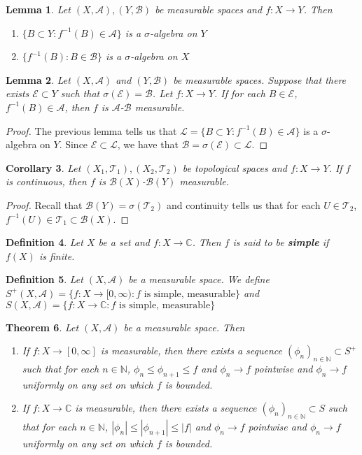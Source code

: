 \documentclass[12pt]{amsart}
\newtheorem{thm}{Theorem}[section]
\newtheorem{lem}[thm]{Lemma}
\newtheorem{cor}[thm]{Corollary}
\newtheorem{defn}[thm]{Definition}
\newcommand{\sig}{\sigma}
\newcommand{\C}{\mathbb{C}}
\newcommand{\N}{\mathbb{N}}
\newcommand{\MA}{\mathcal{A}}
\newcommand{\MB}{\mathcal{B}}
\newcommand{\ML}{\mathcal{L}}
\newcommand{\ME}{\mathcal{E}}
\newcommand{\MT}{\mathcal{T}}
\newcommand{\RG}{[0,\infty]}
\newcommand{\Rg}{[0,\infty)}
\begin{document}
\begin{lem}
Let $(X,\MA), (Y,\MB)$ be measurable spaces and $f: X \rightarrow Y$. Then 
\begin{enumerate}
\item $\{B \subset Y: f^{-1}(B) \in \MA\}$ is a $\sig$-algebra on $Y$
\item $\{f^{-1}(B): B \in \MB\}$ is a $\sig$-algebra on $X$
\end{enumerate}
\end{lem}

\begin{lem}
Let $(X,\MA)$ and $(Y, \MB)$ be measurable spaces. Suppose that there exists $\ME \subset Y$ such that $\sig(\ME) = \MB$. Let $f:X \rightarrow Y$. If for each $B \in \ME$, $f^{-1}(B) \in \MA$, then $f$ is $\MA$-$\MB$ measurable.
\end{lem}

\begin{proof}
The previous lemma tells us that $\ML = \{B \subset Y: f^{-1}(B) \in \MA\}$ is a $\sig$-algebra on $Y$. Since $\ME \subset \ML$, we have that $\MB = \sig(\ME) \subset \ML$.
\end{proof}

\begin{cor}
Let $(X_1,\MT_1), (X_2,\MT_2)$ be topological spaces and $f: X \rightarrow Y$. If $f$ is continuous, then $f$ is $\MB(X)$-$\MB(Y)$ measurable.
\end{cor}

\begin{proof}
Recall that $\MB(Y) = \sig(\MT_2)$ and continuity tells us that for each $U \in \MT_2$, $f^{-1}(U) \in \MT_1 \subset \MB(X)$. 
\end{proof}

\begin{defn}
Let $X$ be a set and $f:X \rightarrow \C$. Then $f$ is said to be \textbf{simple} if $f(X)$ is finite.
\end{defn}

\begin{defn}
Let $(X,\MA)$ be a measurable space. We define $S^+(X,\MA) = \{f:X \rightarrow \Rg: f \text{ is simple, measurable}\}$ and $S(X,\MA) = \{f: X \rightarrow \C: f \text{ is simple, measurable}\}$
\end{defn}

\begin{thm}
Let $(X, \MA)$ be a measurable space. Then 
\begin{enumerate}
\item If $f: X \rightarrow \RG$ is measurable, then there exists a sequence $(\phi_n)_{n \in \N} \subset S^+$ such that for each $n \in \N$, $\phi_n \leq \phi_{n+1} \leq f$ and $\phi_n \rightarrow f$ pointwise and $\phi_n \rightarrow f$ uniformly on any set on which $f$ is bounded.

\item If $f: X \rightarrow \C$ is measurable, then there exists a sequence $(\phi_n)_{n \in \N} \subset S$ such that for each $n \in \N$, $|\phi_n| \leq |\phi_{n+1}| \leq |f|$ and $\phi_n \rightarrow f$ pointwise and $\phi_n \rightarrow f$ uniformly on any set on which $f$ is bounded.
\end{enumerate}
\end{thm}
\end{document}
